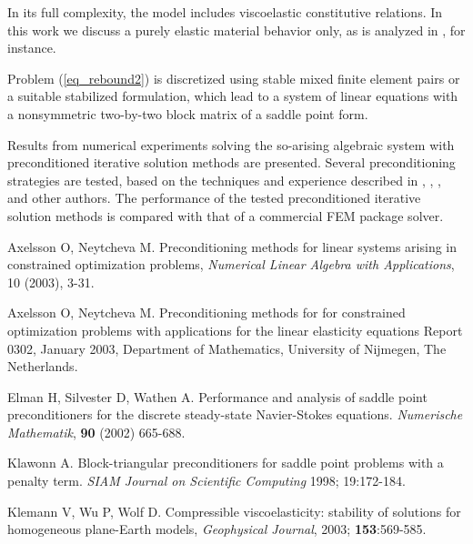 \documentclass{report}
\begin{document}
In its full complexity, the model includes viscoelastic constitutive
relations. In this work we discuss a purely elastic material behavior
only, as is analyzed in \cite{KlemannWuWolf}, for instance.

Problem (\ref{eq_rebound2}) is discretized using stable mixed finite
element pairs or a suitable stabilized formulation,
which lead to a system of linear equations with a nonsymmetric
two-by-two block matrix of a saddle point form.

Results from numerical experiments solving the so-arising algebraic
system with preconditioned iterative solution methods are presented.
Several preconditioning strategies are tested, based on the techniques
and experience described in \cite{Klawonn}, \cite{elman},
\cite{AxelssonNeytcheva}, \cite{AxelssonNeytcheva1} and other authors.
The performance of the tested preconditioned iterative solution methods
is compared with that of a commercial FEM package solver.

\begin{thebibliography}{ABC}
Axelsson O, Neytcheva M.
Preconditioning methods for linear systems arising in constrained optimization problems,
{\em Numerical Linear Algebra with Applications}, 10 (2003), 3-31.

Axelsson O, Neytcheva M.
Preconditioning methods for for constrained optimization problems with
applications for the linear elasticity equations
Report 0302, January 2003, Department of Mathematics,
University of Nijmegen, The Netherlands.

Elman H, Silvester D, Wathen A. Performance and analysis of saddle point
preconditioners for the discrete steady-state Navier-Stokes equations.
\textit{Numerische Mathematik}, {\bf 90} (2002) 665-688.

 Klawonn A. Block-triangular preconditioners for saddle
point problems with a penalty term. {\em SIAM Journal on Scientific
Computing} 1998;
19:172-184.

Klemann V, Wu P, Wolf D. Compressible viscoelasticity: stability of
solutions for homogeneous plane-Earth models,
\textit{Geophysical Journal}, 2003; \textbf{153}:569-585.

\end{thebibliography}
\end{document}
